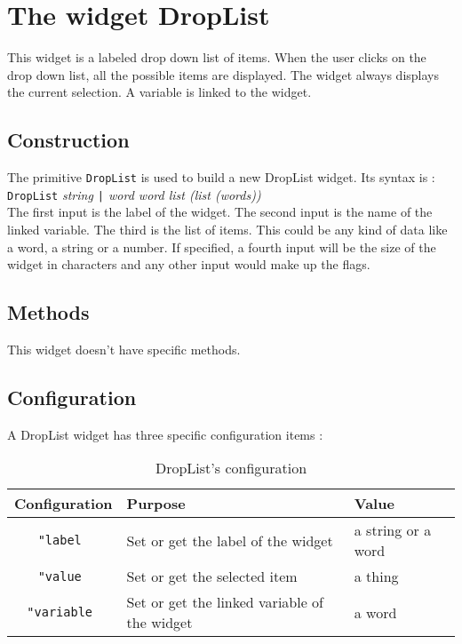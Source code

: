 \section{The widget DropList}

This widget is a labeled drop down list of items. When the user clicks on the drop down list, all the possible items are displayed. The widget always displays the current selection. A variable is linked to the widget.

\subsection{Construction}

The primitive {\tt DropList} is used to build a new DropList widget. Its syntax is :\\

{\tt DropList} {\it string \verb?|? word word list (list (words)) }\\

The first input is the label of the widget. The second input is the name of the linked variable. The third is the list of items.  This could be any kind of data like a word, a string or a number. If specified, a fourth input will be the size of the widget in characters and any other input would make up the flags.

\subsection{Methods}

This widget doesn't have specific methods.

\subsection{Configuration}

A DropList widget has three specific configuration items :

\begin{table}[ht]
\centering
\begin{tabular}{|c|p{5cm}|p{5cm}|}
\hline
\bf Configuration & \bf Purpose & \bf Value \\
\hline
\tt "label\index{DropList@\textbf{DropList}!Configuration!label} & Set or get the label of the widget & a string or a word\\
\hline
\tt "value\index{DropList@\textbf{DropList}!Configuration!value} & Set or get the selected item & a thing\\
\hline
\tt "variable\index{DropList@\textbf{DropList}!Configuration!variable} & Set or get the linked variable of the widget & a word\\
\hline
\end{tabular}
\caption{DropList's configuration}
\end{table}

